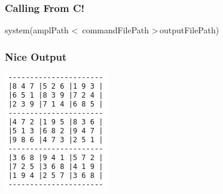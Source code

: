 \documentclass{beamer}
\begin{document}
   \begin{frame}
       \frametitle{Calling From C!}
        system(amplPath \textless \, commandFilePath \textgreater \,outputFilePath)
   \end{frame}
   \begin{frame}
       \frametitle{Nice Output}
        \centering
        \includegraphics[scale=.75]{figures/exampleOutput.png}
   \end{frame}
\end{document}
